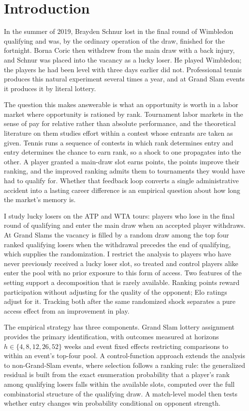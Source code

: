 \section{Introduction}
\label{sec:intro}

In the summer of 2019, Brayden Schnur lost in the final round of Wimbledon qualifying and was, by the ordinary operation of the draw, finished for the fortnight. Borna Coric then withdrew from the main draw with a back injury, and Schnur was placed into the vacancy as a lucky loser. He played Wimbledon; the players he had been level with three days earlier did not. Professional tennis produces this natural experiment several times a year, and at Grand Slam events it produces it by literal lottery.

The question this makes answerable is what an opportunity is worth in a labor market where opportunity is rationed by rank. Tournament labor markets in the sense of \citet{Lazear1981_tournaments} pay for relative rather than absolute performance, and the theoretical literature on them studies effort within a contest whose entrants are taken as given. Tennis runs a sequence of contests in which rank determines entry and entry determines the chance to earn rank, so a shock to one propagates into the other. A player granted a main-draw slot earns points, the points improve their ranking, and the improved ranking admits them to tournaments they would have had to qualify for. Whether that feedback loop converts a single administrative accident into a lasting career difference is an empirical question about how long the market's memory is.

I study lucky losers on the ATP and WTA tours: players who lose in the final round of qualifying and enter the main draw when an accepted player withdraws. At Grand Slams the vacancy is filled by a random draw among the top four ranked qualifying losers when the withdrawal precedes the end of qualifying, which supplies the randomization. I restrict the analysis to players who have never previously received a lucky loser slot, so treated and control players alike enter the pool with no prior exposure to this form of access. Two features of the setting support a decomposition that is rarely available. Ranking points reward participation without adjusting for the quality of the opponent; Elo ratings adjust for it. Tracking both after the same randomized shock separates a pure access effect from an improvement in play.

The empirical strategy has three components. Grand Slam lottery assignment provides the primary identification, with outcomes measured at horizons $h \in \{4, 8, 12, 26, 52\}$ weeks and event fixed effects restricting comparisons to within an event's top-four pool. A control-function approach extends the analysis to non-Grand-Slam events, where selection follows a ranking rule: the generalized residual is built from the exact enumeration probability that a player's rank among qualifying losers falls within the available slots, computed over the full combinatorial structure of the qualifying draw. A match-level model then tests whether entry changes win probability conditional on opponent strength.

